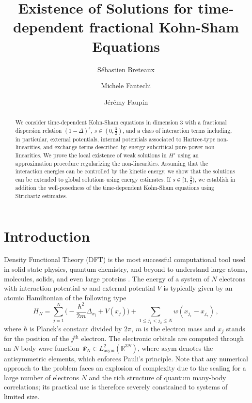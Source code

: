 \documentclass[12pt,a4paper]{amsart}
\title{Existence of Solutions for time-dependent fractional Kohn-Sham Equations}
\author[S. Breteaux]{S{\'e}bastien Breteaux}
\author[M. Fantechi]{Michele Fantechi}
\author[J. Faupin]{J{\'e}r{\'e}my Faupin}
\numberwithin{equation}{section}
\begin{document}
	\maketitle
	
	\begin{abstract}
		We consider time-dependent Kohn-Sham equations in dimension $3$ with a fractional dispersion relation $(1-\Delta)^s$, $s\in(0,\frac32)$, and a class of interaction terms including, in particular, external potentials, internal potentials associated to Hartree-type non-linearities, and exchange terms described by energy subcritical pure-power non-linearities. We prove the local existence of weak solutions in $H^s$ using an approximation procedure regularizing the non-linearities. Assuming that the interaction energies can be controlled by the kinetic energy, we show that the solutions can be extended to global solutions using energy estimates. If $s\in[1,\frac32)$, we establish in addition the well-posedness of the time-dependent Kohn-Sham equations using Strichartz estimates.
	\end{abstract}
	
	\section{Introduction}
	
	Density Functional Theory (DFT) is the most successful computational tool used in solid state physics, quantum chemistry, and beyond to understand large atoms, molecules, solids, and even large proteins \cite{engel2011density}. The energy of a system of $N$ electrons with interaction potential $w$ and external potential $V$ is typically given by an atomic Hamiltonian of the following type
	\begin{equation}\label{eq:N-body-Ham}
		H_N = \sum_{j=1}^N \Big( -\frac{\hbar^2}{2m} \Delta_{x_j} + V(x_j) \Big) + \sum_{1\leq j_1 < j_2\leq N} w(x_{j_1}-x_{j_2})\, ,
	\end{equation}
	where $\hbar$ is Planck's constant divided by $2\pi$, $m$ is the electron mass and $x_j$ stands for the position of the $j^{\text{th}}$ electron.  The electronic orbitals are computed through an $N$-body wave function~$ \Psi_N \in L^2_{\mathrm{asym}}(\mathbb{R}^{3N})$, where $\mathrm{asym}$ denotes the antisymmetric elements, which enforces Pauli’s principle. Note that any numerical approach to the problem faces an explosion of complexity due to the scaling for a large number of electrons $N$ and the rich structure of quantum many-body correlations; its practical use is therefore severely constrained to systems of limited size.
	
\end{document}
